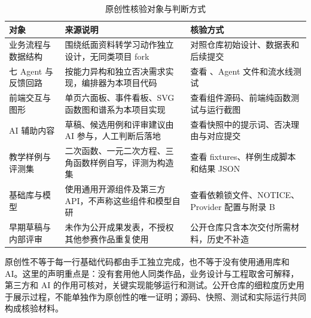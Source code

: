 \begin{table}[H]
\centering\footnotesize
\caption{原创性核验对象与判断方式}
\begin{tabularx}{\textwidth}{@{}L{3.0cm}Y L{3.7cm}@{}}
\toprule
\textbf{对象} & \textbf{来源说明} & \textbf{核验方式} \\
\midrule
业务流程与数据结构 & 围绕纸面资料转学习动作独立设计，无同类项目 fork & 对照仓库初始设计、数据表和后续提交 \\
七 Agent 与反馈回路 & 按能力异构和独立否决需求实现，编排器为本项目代码 & 查看 、Agent 文件和流水线测试 \\
前端交互与图形 & 单页六面板、事件看板、SVG 函数图和谱系为本项目实现 & 查看组件源码、前端纯函数测试与运行截图 \\
AI 辅助内容 & 草稿、候选用例和评审建议由 AI 参与，人工判断后落地 & 查看快照中的提示词、否决理由与对应提交 \\
教学样例与评测集 & 二次函数、一元二次方程、三角函数样例自写，评测为构造集 & 查看 fixtures、样例生成脚本和结果 JSON \\
基础库与模型 & 使用通用开源组件及第三方 API，不声称这些组件和模型自研 & 查看依赖锁文件、NOTICE、Provider 配置与附录 B \\
早期草稿与内部评审 & 未作为公开成果发表，不授权其他参赛作品重复使用 & 公开仓库只含本次交付所需材料，历史不补造 \\
\bottomrule
\end{tabularx}
\end{table}

原创性不等于每一行基础代码都由手工独立完成，也不等于没有使用通用库和 AI。这里的声明重点是：没有套用他人同类作品，业务设计与工程取舍可解释，第三方和 AI 的作用可核对，关键实现能够运行和测试。公开仓库的细粒度历史用于展示过程，不能单独作为原创性的唯一证明；源码、快照、测试和实际运行共同构成核验材料。
